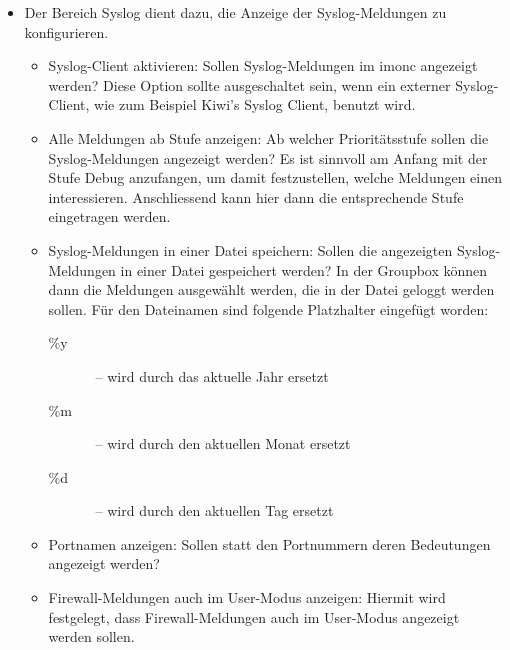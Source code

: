 \begin{itemize}
  \item Der Bereich Syslog dient dazu, die Anzeige der Syslog-Meldungen zu 
    konfigurieren.
    \begin{itemize}
      \item Syslog-Client aktivieren: Sollen Syslog-Meldungen im imonc angezeigt 
        werden? Diese Option sollte ausgeschaltet sein, wenn ein externer 
        Syslog-Client, wie zum Beispiel Kiwi's Syslog Client, benutzt wird.
      \item Alle Meldungen ab Stufe anzeigen: Ab welcher Prioritätsstufe sollen 
        die Syslog-Meldungen angezeigt werden? Es ist sinnvoll am Anfang mit der 
        Stufe Debug anzufangen, um damit festzustellen, welche Meldungen einen 
        interessieren. Anschliessend kann hier dann die entsprechende Stufe 
        eingetragen werden.
      \item Syslog-Meldungen in einer Datei speichern: Sollen die angezeigten
        Syslog-Meldungen in einer Datei gespeichert werden? In der Groupbox 
        können dann die Meldungen ausgewählt werden, die in der Datei geloggt 
        werden sollen. Für den Dateinamen sind folgende Platzhalter eingefügt 
        worden:
        \begin{description}
          \item[\%y]~-- wird durch das aktuelle Jahr ersetzt
          \item[\%m]~-- wird durch den aktuellen Monat ersetzt
          \item[\%d]~-- wird durch den aktuellen Tag ersetzt
        \end{description}
      \item Portnamen anzeigen: Sollen statt den Portnummern deren Bedeutungen
        angezeigt werden?
      \item Firewall-Meldungen auch im User-Modus anzeigen: Hiermit wird
        festgelegt, dass Firewall-Meldungen auch im User-Modus angezeigt werden
        sollen.
    \end{itemize}


\end{itemize}
